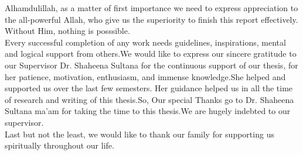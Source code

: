 Alhamdulillah, as a matter of first importance we need to express appreciation to the all-powerful Allah, who give us the superiority to finish this report effectively. Without Him, nothing is posssible.\\

Every successful completion of any work needs guidelines, inspirations, mental and logical support from others.We would like to express our sincere gratitude to our Supervisor Dr. Shaheena Sultana for the continuous support of our thesis, for her patience, motivation, enthusiasm, and immense knowledge.She helped and supported us over the last few semesters. Her guidance helped us in all the time of research and writing of this thesis.So, Our special Thanks go to Dr. Shaheena Sultana ma'am for taking the time to this thesis.We are hugely indebted to our supervisor.\\

Last but not the least, we would like to thank our family for supporting us spiritually throughout our life.

\endinput
